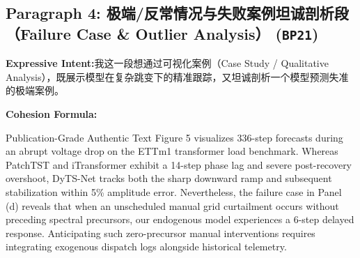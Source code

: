\subsection*{Paragraph 4: 极端/反常情况与失败案例坦诚剖析段（Failure Case \& Outlier Analysis） (\texttt{BP21})}
\noindent\textbf{Expressive Intent:}\enspace 我这一段想通过可视化案例（Case Study / Qualitative Analysis），既展示模型在复杂跳变下的精准跟踪，又坦诚剖析一个模型预测失准的极端案例。\par
\noindent\textbf{Cohesion Formula:}\par\vspace{4pt}
\begin{ExampleBox}{Publication-Grade Authentic Text}
Figure 5 visualizes 336-step forecasts during an abrupt voltage drop on the ETTm1 transformer load benchmark. Whereas PatchTST and iTransformer exhibit a 14-step phase lag and severe post-recovery overshoot, DyTS-Net tracks both the sharp downward ramp and subsequent stabilization within 5\% amplitude error. Nevertheless, the failure case in Panel (d) reveals that when an unscheduled manual grid curtailment occurs without preceding spectral precursors, our endogenous model experiences a 6-step delayed response. Anticipating such zero-precursor manual interventions requires integrating exogenous dispatch logs alongside historical telemetry.
\end{ExampleBox}
